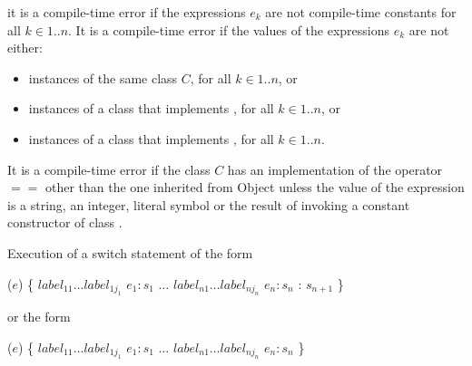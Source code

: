 \documentclass{article}
\newcommand{\code}[1]{{\sf #1}}
\begin{document}
 it is a compile-time error if the expressions $e_k$ are not compile-time constants for all  $k \in 1..n$.  It is a compile-time error if the values of the expressions $e_k$ are not either:
 \begin{itemize}
 \item instances of the same class $C$, for all $k \in 1..n$,  or 
 \item instances of a class that implements , for all $k \in 1..n$,  or 
 \item instances of a class that implements , for all $k \in 1..n$. 
 \end{itemize}
 

\LMHash{}
It is a compile-time error if the class $C$ has an implementation of the operator $==$ other than the one inherited from \code{Object} unless the value of the expression is a string, an integer, literal symbol or the result of invoking a constant constructor of class .
 


\LMHash{}
Execution of a switch statement of the form

\begin{dartCode}
\SWITCH{} ($e$) \{ 
   \CASE{} $label_{11} \ldots label_{1j_1}$ $e_1: s_1$ 
   $\ldots$  
   \CASE{} $label_{n1} \ldots label_{nj_n}$ $e_n: s_n$ 
   \DEFAULT{}: $s_{n+1}$ 
\}
\end{dartCode}
 
or the form 
 
\begin{dartCode}
\SWITCH{} ($e$) \{ 
   \CASE{} $label_{11} \ldots label_{1j_1}$ $e_1: s_1$
   $\ldots$  
   \CASE{} $label_{n1} \ldots label_{nj_n}$ $e_n: s_n$ 
\}
\end{dartCode}
\end{document}
